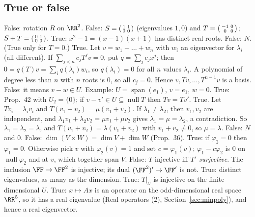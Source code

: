 \documentclass[10pt]{scrartcl}
\DeclareMathOperator{\nul}{null}
\DeclareMathOperator{\spn}{span}
\begin{document}
\subsection*{True or false}
\begin{enumerate}
  \ii False: rotation $R$ on $\RR^2$.
  \ii False: $S=\begin{psmallmatrix}1&1\\0&0\end{psmallmatrix}$ (eigenvalues $1,0$) and $T=\begin{psmallmatrix}-1&0\\0&0\end{psmallmatrix}$; $S+T=\begin{psmallmatrix}0&1\\0&0\end{psmallmatrix}$.
  \ii True: $x^2-1=(x-1)(x+1)$ has distinct real roots.
  \ii False: $N$. (True only for $T=0$.)
  \ii True. Let $v=w_1+\dots+w_n$ with $w_i$ an eigenvector for $\lambda_i$ (all different). If $\sum_{j<n}c_jT^jv=0$, put $q=\sum_jc_jx^j$; then $0=q(T)v=\sum_iq(\lambda_i)w_i$, so $q(\lambda_i)=0$ for all $n$ values $\lambda_i$. A polynomial of degree less than $n$ with $n$ roots is $0$, so all $c_j=0$. Hence $v,Tv,\dots,T^{n-1}v$ is a basis.
  \ii False: it means $v-w\in U$. Example: $U=\spn(e_1)$, $v=e_1$, $w=0$.
  \ii True: Prop.~42 with $U_2=\{0\}$; if $v-v'\in U\subseteq\nul T$ then $Tv=Tv'$.
  \ii True. Let $Tv_i=\lambda_iv_i$ and $T(v_1+v_2)=\mu(v_1+v_2)$. If $\lambda_1\ne\lambda_2$, then $v_1,v_2$ are independent, and $\lambda_1v_1+\lambda_2v_2=\mu v_1+\mu v_2$ gives $\lambda_1=\mu=\lambda_2$, a contradiction. So $\lambda_1=\lambda_2=\lambda$, and $T(v_1+v_2)=\lambda(v_1+v_2)$ with $v_1+v_2\ne0$, so $\mu=\lambda$.
  \ii False: $N$ and $0$.
  \ii False: $\dim(V\times W)=\dim V+\dim W$ (Prop.~36).
  \ii True: if $\varphi_2=0$ then $\varphi_1=0$. Otherwise pick $v$ with $\varphi_2(v)=1$ and set $c=\varphi_1(v)$; $\varphi_1-c\varphi_2$ is $0$ on $\nul\varphi_2$ and at $v$, which together span $V$.
  \ii False: $T$ injective iff $T'$ \emph{surjective}. The inclusion $\FF\to\FF^2$ is injective; its dual $(\FF^2)'\to\FF'$ is not.
  \ii True: distinct eigenvalues, as many as the dimension.
  \ii True: $T|_U$ is injective on the finite-dimensional $U$.
  \ii True: $x\mapsto Ax$ is an operator on the odd-dimensional real space $\RR^5$, so it has a real eigenvalue (Real operators (2), Section~\ref{sec:minpoly}), and hence a real eigenvector.
\end{enumerate}
\end{document}
